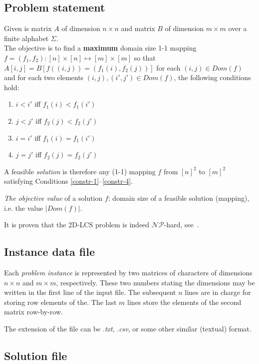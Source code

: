 \documentclass[]{article}
\begin{document}
\subsection{Problem statement}

Given is matrix  $A$ of dimension $n\times n$ and  matrix $B$ of dimension $m \times m$ over a finite alphabet $\Sigma$.  \\
The objective is to find a \textbf{maximum} domain size 1-1 mapping $f=(f_1, f_2) \colon [n] \times [n] \mapsto [m] \times [m] $ so that $A[i, j] = B[f((i, j))=(f_1(i), f_2(j))]$ for each $(i, j) \in Dom(f)$ and
for each two elements $(i, j), (i',j') \in Dom(f)$, the following conditions hold:
\begin{enumerate}  
	\item $i < i'$ iff $f_1(i) < f_1(i')$  \label{constr-1}
	\item $j < j'$ iff $f_2(j) < f_2(j')$
	\item $i = i'$ iff $f_1(i) = f_1(i')$
    \item $j = j'$ iff $f_2(j) = f_2(j')$	\label{constr-4}
\end{enumerate}


A feasible \textit{solution} is therefore any (1-1) mapping $f$ from $[n]^2$ to $[m]^2$ satisfying Conditions \ref{constr-1}--\ref{constr-4}. 

\textit{The objective value} of a  solution $f$:  domain size of a feasible solution (mapping), i.e. the value $|Dom(f)|$. 

It is proven that the 2D-LCS problem is indeed $\mathcal{NP}$-hard, see~\cite{2d_lcs_amir}. 

  

\subsection{Instance data file}


Each \textit{problem instance} is represented by two matrices of characters of dimensions $n \times n$ and $m \times m$, respectively. These two numbers stating the dimensions may be written in the first line of the input file.  The subsequent $n$ lines are in charge for storing row elements of the. The last $m$ lines store the elements of the second matrix row-by-row.

The extension of the file can be .\textit{txt}, .\textit{csv}, or some other similar (textual) format.

\subsection{Solution file}
\end{document}
